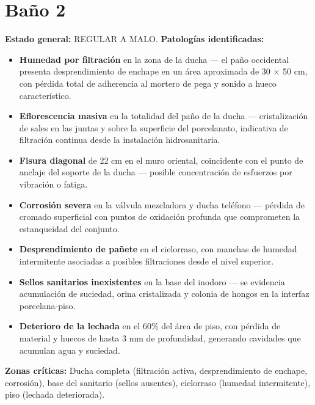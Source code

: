 \documentclass[12pt]{article}
\begin{document}
\section{Baño 2}
\noindent\textbf{Estado general:} REGULAR A MALO.
\medskip
\noindent\textbf{Patologías identificadas:}
\begin{itemize}[leftmargin=*,nosep]
  \item \textbf{Humedad por filtración} en la zona de la ducha — el paño occidental presenta desprendimiento de enchape en un área aproximada de 30 $\times$ 50 cm, con pérdida total de adherencia al mortero de pega y sonido a hueco característico.
  \item \textbf{Eflorescencia masiva} en la totalidad del paño de la ducha — cristalización de sales en las juntas y sobre la superficie del porcelanato, indicativa de filtración continua desde la instalación hidrosanitaria.
  \item \textbf{Fisura diagonal} de 22 cm en el muro oriental, coincidente con el punto de anclaje del soporte de la ducha — posible concentración de esfuerzos por vibración o fatiga.
  \item \textbf{Corrosión severa} en la válvula mezcladora y ducha teléfono — pérdida de cromado superficial con puntos de oxidación profunda que comprometen la estanqueidad del conjunto.
  \item \textbf{Desprendimiento de pañete} en el cielorraso, con manchas de humedad intermitente asociadas a posibles filtraciones desde el nivel superior.
  \item \textbf{Sellos sanitarios inexistentes} en la base del inodoro — se evidencia acumulación de suciedad, orina cristalizada y colonia de hongos en la interfaz porcelana-piso.
  \item \textbf{Deterioro de la lechada} en el 60\% del área de piso, con pérdida de material y huecos de hasta 3 mm de profundidad, generando cavidades que acumulan agua y suciedad.
\end{itemize}
\medskip
\noindent\textbf{Zonas críticas:} Ducha completa (filtración activa, desprendimiento de enchape, corrosión), base del sanitario (sellos ausentes), cielorraso (humedad intermitente), piso (lechada deteriorada).
\bigskip
\end{document}
